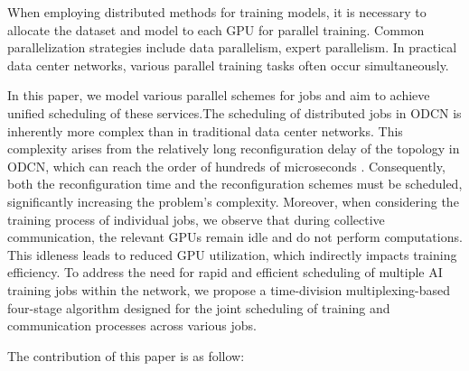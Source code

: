 \documentclass[conference]{IEEEtran}
\begin{document}

When employing distributed methods for training models, it is necessary to allocate the dataset and model to each GPU for parallel training. Common parallelization strategies include data parallelism, expert parallelism. In practical data center networks, various parallel training tasks often occur simultaneously.


In this paper, we model various parallel schemes for jobs and aim to achieve unified scheduling of these services.The scheduling of distributed jobs in ODCN is inherently more complex than in traditional data center networks. This complexity arises from the relatively long reconfiguration delay of the topology in ODCN, which can reach the order of hundreds of microseconds \cite{Zerwas2021}. Consequently, both the reconfiguration time and the reconfiguration schemes must be scheduled, significantly increasing the problem's complexity. Moreover, when considering the training process of individual jobs, we observe that during collective communication, the relevant GPUs remain idle and do not perform computations. This idleness leads to reduced GPU utilization, which indirectly impacts training efficiency. To address the need for rapid and efficient scheduling of multiple AI training jobs within the network, we propose a time-division multiplexing-based four-stage algorithm designed for the joint scheduling of training and communication processes across various jobs.

The contribution of this paper is as follow:
\end{document}
